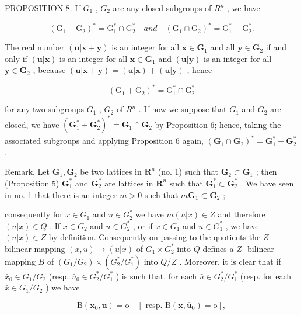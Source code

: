 PROPOSITION 8. If \(G_{1}\) , \(G_{2}\) are any closed subgroups of \(R^{n}\) , we have

\[
(\mathrm{G} _ {1} + \mathrm{G} _ {2}) ^ {*} = \mathrm{G} _ {1} ^ {*} \cap \mathrm{G} _ {2} ^ {*} \quad a n d \quad (\mathrm{G} _ {1} \cap \mathrm{G} _ {2}) ^ {*} = \mathrm{G} _ {1} ^ {*} + \mathrm{G} _ {2} ^ {*}.
\]

The real number \((\pmb{u}|\pmb{x} + \pmb{y})\) is an integer for all \(\pmb{x} \in \mathbf{G}_1\) and all \(\pmb{y} \in \mathbf{G}_2\) if and only if \((\pmb{u}|\pmb{x})\) is an integer for all \(\pmb{x} \in \mathbf{G}_1\) and \((\pmb{u}|\pmb{y})\) is an integer for all \(\pmb{y} \in \mathbf{G}_2\) , because \((\pmb{u}|\pmb{x} + \pmb{y}) = (\pmb{u}|\pmb{x}) + (\pmb{u}|\pmb{y})\) ; hence

\[
(\mathrm{G} _ {1} + \mathrm{G} _ {2}) ^ {*} = \mathrm{G} _ {1} ^ {*} \cap \mathrm{G} _ {2} ^ {*}
\]

for any two subgroups \(G_{1}\) , \(G_{2}\) of \(R^{n}\) . If now we suppose that \(G_{1}\) and \(G_{2}\) are closed, we have \((\mathbf{G}_{1}^{*} + \mathbf{G}_{2}^{*})^{*} = \mathbf{G}_{1} \cap \mathbf{G}_{2}\) by Proposition 6; hence, taking the associated subgroups and applying Proposition 6 again, \((\mathbf{G}_{1} \cap \mathbf{G}_{2})^{*} = \overline{\mathbf{G}_{1}^{*} + \mathbf{G}_{2}^{*}}\) .

Remark. Let \(\mathbf{G}_1, \mathbf{G}_2\) be two lattices in \(\mathbf{R}^n\) (no. 1) such that \(\mathbf{G}_2 \subset \mathbf{G}_1\) ; then (Proposition 5) \(\mathbf{G}_1^*\) and \(\mathbf{G}_2^*\) are lattices in \(\mathbf{R}^n\) such that \(\mathbf{G}_1^* \subset \mathbf{G}_2^*\) . We have seen in no. 1 that there is an integer \(m > 0\) such that \(m\mathbf{G}_1 \subset \mathbf{G}_2\) ;

consequently for \(x \in G_1\) and \(u \in G_2^*\) we have \(m(u|x) \in Z\) and therefore \((u|x) \in Q\) . If \(x \in G_2\) and \(u \in G_2^*\) , or if \(x \in G_1\) and \(u \in G_1^*\) , we have \((u|x) \in Z\) by definition. Consequently on passing to the quotients the \(Z\) -bilinear mapping \((x, u) \to (u|x)\) of \(G_1 \times G_2^*\) into \(Q\) defines a \(Z\) -bilinear mapping \(B\) of \((G_1/G_2) \times (G_2^*/G_1^*)\) into \(Q/Z\) . Moreover, it is clear that if \(\bar{x}_0 \in G_1/G_2\) (resp. \(\bar{u}_0 \in G_2^*/G_1^*\) ) is such that, for each \(\bar{u} \in G_2^*/G_1^*\) (resp. for each \(\bar{x} \in G_1/G_2\) ) we have

\[
\mathrm{B} (\overline {{{\boldsymbol {x}}}} _ {0}, \boldsymbol {u}) = \mathrm{o} \quad [ \text { resp. } \mathrm{B} (\overline {{{\boldsymbol {x}}}}, \overline {{{\boldsymbol {u}}}} _ {0}) = \mathrm{o} ],
\]

